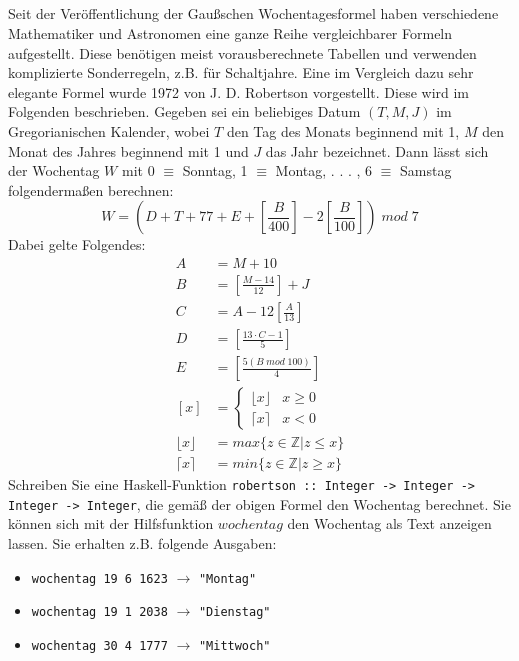 \documentclass[
  10pt,                   %
  DIV12,
  german,                 %
  oneside,                %
  parskip=half,           %
  headings=normal,        %
  captions=tableheading,  %
]{scrartcl}
\begin{document}
\subsection{}
Seit der Veröffentlichung der Gaußschen Wochentagesformel haben verschiedene Mathematiker und Astronomen eine ganze Reihe vergleichbarer Formeln aufgestellt. Diese benötigen meist vorausberechnete Tabellen und verwenden komplizierte Sonderregeln, z.B. für Schaltjahre. Eine im Vergleich dazu sehr elegante Formel wurde 1972 von J. D. Robertson vorgestellt. Diese wird im Folgenden beschrieben. Gegeben sei ein beliebiges Datum $(T, M, J)$ im Gregorianischen Kalender, wobei $T$ den Tag des Monats beginnend mit 1, $M$ den Monat des Jahres beginnend mit 1 und $J$ das Jahr bezeichnet. Dann lässt sich der Wochentag $W$ mit 0 $\equiv$ Sonntag, 1 $\equiv$ Montag, . . . , 6 $\equiv$ Samstag folgendermaßen berechnen:
\begin{displaymath}
W = \left(D  + T + 77 + E + \left[\frac{B}{400}\right] - 2 \left[\frac{B}{100}\right]\right) \;mod\;7
\end{displaymath}
Dabei gelte Folgendes:
\begin{align*}
A &= M + 10\\
B &= \left[\frac{M - 14}{12}\right] + J\\
C &= A - 12 \left[\frac{A}{13}\right]\\
D &= \left[\frac{13 \cdot C - 1}{5}\right]\\
E &= \left[\frac{5(B \; mod \; 100)}{4}\right]\\
[x] &= \begin{cases}\lfloor x \rfloor& x \geq 0 \\ \lceil x \rceil & x < 0 \end{cases} \\
\lfloor x \rfloor &= max\{ z \in \mathbb{Z} | z \leq x\}\\
\lceil x \rceil &= min\{ z \in \mathbb{Z} | z \geq x\}
\end{align*}
Schreiben Sie eine Haskell-Funktion \lstinline|robertson :: Integer -> Integer -> Integer -> Integer|, die gemäß der obigen Formel den Wochentag berechnet. Sie können sich mit der Hilfsfunktion $wochentag$ den Wochentag als Text anzeigen lassen. Sie erhalten z.B. folgende Ausgaben:
\begin{itemize}
\item \lstinline|wochentag 19 6 1623| $\to$ \lstinline|"Montag"|
\item \lstinline|wochentag 19 1 2038| $\to$ \lstinline|"Dienstag"|
\item \lstinline|wochentag 30 4 1777| $\to$ \lstinline|"Mittwoch"|
\end{itemize}
\end{document}
